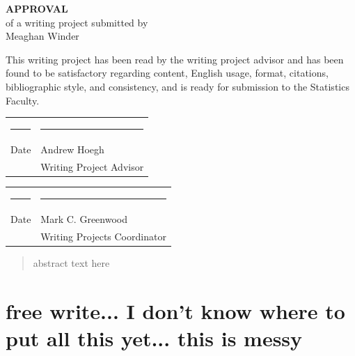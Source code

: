 \documentclass[12pt]{article}\usepackage[]{graphicx}\usepackage[]{color}
\begin{document}
\begin{titlepage}
\null
\begin{center}
{\bf\huge APPROVAL}\\[1.0 in]
of a writing project submitted by\\[.25 in]
Meaghan Winder \\[0.5 in]
\end{center}

\noindent
This writing project has been read by the writing project advisor and
has been found to be satisfactory regarding content, English usage,
format, citations, bibliographic style, and consistency, and is ready
for submission to the Statistics Faculty.

\vspace{.3in}
\begin{center}
\begin{tabular}{ll}
\rule{2.75in}{.03in} & \rule{2.75in}{.03in} \\
Date& Andrew Hoegh \\
& Writing Project Advisor \\
\end{tabular}
\end{center}

\vspace{1cm}

\begin{center}
\begin{tabular}{ll}
\rule{2.75in}{.03in} & \rule{2.75in}{.03in} \\
Date& Mark C. Greenwood \\
& Writing Projects Coordinator \\
\end{tabular}
\end{center}

\end{titlepage}

\newpage
\tableofcontents
\newpage

\begin{abstract}
\noindent abstract text here 
\end{abstract}

\doublespacing

\section{free write... I don't know where to put all this yet... this is messy}
\end{document}

